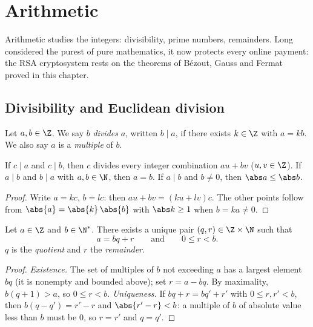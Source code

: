 \chapter{Arithmetic}\label{ch:tle:arith}

Arithmetic studies the integers: divisibility, prime numbers, remainders.
Long considered the purest of pure mathematics, it now protects every online
payment: the RSA cryptosystem rests on the theorems of Bézout, Gauss and
Fermat proved in this chapter.

\section{Divisibility and Euclidean division}

\begin{definition}[Divisibility]\label{def:tle:arith:divides}
Let $a, b \in \Z$. We say $b$ \emph{divides} $a$, written
$b \mid a$, if there exists $k \in \Z$ with $a = kb$. We also say $a$ is a
\emph{multiple} of $b$.
\end{definition}

\begin{proposition}\label{prop:tle:arith:divprops}
If $c \mid a$ and $c \mid b$, then $c$ divides every integer combination
$au + bv$ ($u, v \in \Z$). If $a \mid b$ and $b \mid a$ with
$a,b \in \N$, then $a = b$. If $a \mid b$ and $b \neq 0$, then $\abs a \leq \abs b$.
\end{proposition}

\begin{proof}
Write $a = kc$, $b = lc$: then $au + bv = (ku + lv)c$. The other points
follow from $\abs{a} = \abs{k}\,\abs{b}$ with $\abs k \geq 1$ when
$b = ka \neq 0$.
\end{proof}

\begin{theorem}\label{thm:tle:arith:euclid}
Let $a \in \Z$ and $b \in \N^*$. There exists a unique pair
$(q, r) \in \Z \times \N$ such that
\[
a = bq + r \qquad\text{and}\qquad 0 \leq r < b .
\]
$q$ is the \emph{quotient} and $r$ the \emph{remainder}.
\end{theorem}

\begin{proof}
\emph{Existence.} The set of multiples of $b$ not exceeding $a$ has a
largest element $bq$ (it is nonempty and bounded above); set $r = a - bq$.
By maximality, $b(q+1) > a$, so $0 \leq r < b$.
\emph{Uniqueness.} If $bq + r = bq' + r'$ with $0 \leq r, r' < b$, then
$b(q - q') = r' - r$ and $\abs{r' - r} < b$: a multiple of $b$ of absolute
value less than $b$ must be $0$, so $r = r'$ and $q = q'$.
\end{proof}

